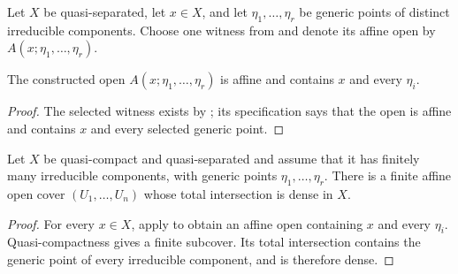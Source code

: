\begin{definition}
  \label{def:nagata-affine-neighbourhood-generic-points}

  Let $X$ be quasi-separated, let $x\in X$, and let
  $\eta_1,\ldots,\eta_r$ be generic points of distinct irreducible
  components.  Choose one witness from
   and denote
  its affine open by $A(x;\eta_1,\ldots,\eta_r)$.
\end{definition}

\begin{lemma}
  \label{lemma:nagata-affine-neighbourhood-generic-points}

  The constructed open $A(x;\eta_1,\ldots,\eta_r)$ is affine and contains
  $x$ and every $\eta_i$.
\end{lemma}

\begin{proof}
  The selected witness exists by
  ; its
  specification says that the open is affine and contains $x$ and every
  selected generic point.
\end{proof}

\begin{lemma}
  \label{lemma:nagata-dense-affine-cover-exists}

  Let $X$ be quasi-compact and quasi-separated and assume that it has finitely
  many irreducible components, with generic points
  $\eta_1,\ldots,\eta_r$.  There is a finite affine open cover
  $(U_1,\ldots,U_n)$ whose total intersection is dense in $X$.
\end{lemma}

\begin{proof}
  For every $x\in X$, apply
   to obtain an affine
  open containing $x$ and every $\eta_i$.  Quasi-compactness gives a finite
  subcover.  Its total intersection contains the generic point of every
  irreducible component, and is therefore dense.
\end{proof}


